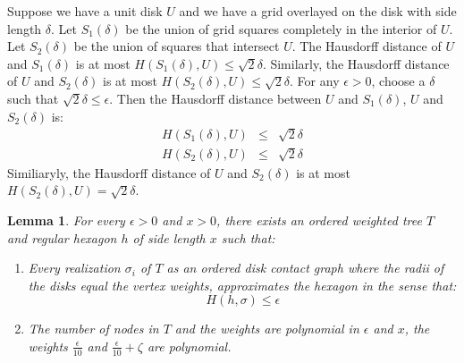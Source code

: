 \documentclass[10pt]{CSUNthesis}
\theoremstyle{plain}%
\newtheorem{lem}{Lemma}
\theoremstyle{definition}
\theoremstyle{remark}
\newcommand{\lr}[1]{\left( #1 \right)}
\begin{document}
Suppose we have a unit disk $U$ and we have a grid overlayed on the disk with side length $\delta$.  
Let $S_1(\delta)$ be the union of grid squares completely in the interior of $U$.  
Let $S_2(\delta)$ be the union of squares that intersect $U$.  
The Hausdorff distance of $U$ and $S_1(\delta)$ is at most $H\lr{S_1(\delta), U}\leq\sqrt{2}\delta$.  
Similarly, the Hausdorff distance of $U$ and $S_2(\delta)$ is at most $H\lr{S_2(\delta), U}\leq\sqrt{2}\delta$.
For any $\epsilon>0$, choose a $\delta$ such that $\sqrt{2}\delta \leq \epsilon$. Then the Hausdorff distance between $U$ and $S_1(\delta)$, $U$ and $S_2(\delta)$ is: 
$$
\begin{array}{rcl}
H\lr{S_1(\delta), U}&\leq&\sqrt{2}\delta\\
H\lr{S_2(\delta), U}&\leq&\sqrt{2}\delta
\end{array}
$$  
Similiaryly, the Hausdorff distance of $U$ and $S_2(\delta)$ is at most $H\lr{S_2(\delta), U}=\sqrt{2}\delta$.

\begin{lem}\label{lem:ch4IntroLemma}
For every $\epsilon > 0$ and $x>0$, there exists an ordered weighted tree $T$ and regular hexagon $h$ of side length $x$ such that:
\begin{enumerate}
\item Every realization $\sigma_i$ of $T$ as an ordered disk contact graph where the radii of the disks equal the vertex weights, approximates the hexagon in the sense that:
$$H\lr{h,\sigma}\leq\epsilon$$
\item The number of nodes in $T$ and the weights are polynomial in $\epsilon$ and $x$, the weights $\frac{\epsilon}{10}$ and $\frac{\epsilon}{10} + \zeta$ are polynomial.
\end{enumerate}
\end{lem} 
\end{document}
